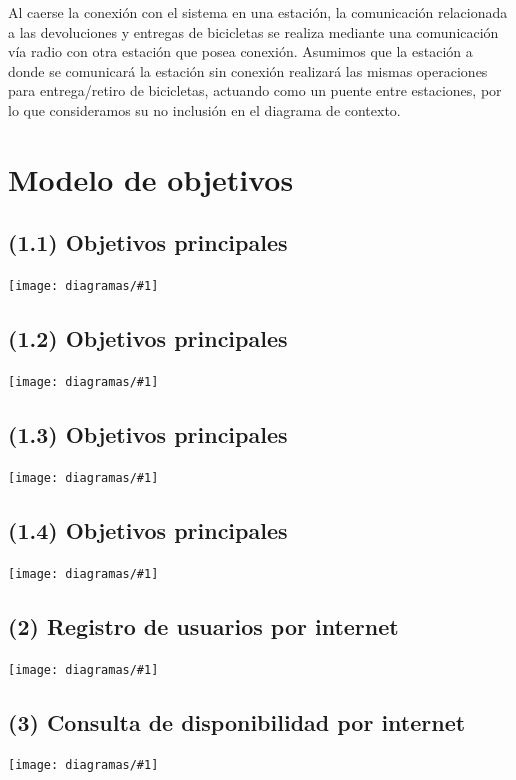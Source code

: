 \documentclass[a4paper, 10pt, twoside]{article}
\newcommand{\diagramav}[1]{
  \texttt{[image: diagramas/\#1]}
}
\newcommand{\diagramah}[1]{
  \texttt{[image: diagramas/\#1]}
}
\begin{document}
Al caerse la conexión con el sistema en una estación, la comunicación relacionada a las devoluciones y entregas de bicicletas se realiza
mediante una comunicación vía radio con otra estación que posea conexión.
Asumimos que la estación a donde se comunicará la estación sin conexión realizará las mismas operaciones para entrega/retiro de bicicletas, actuando como un puente entre estaciones, por lo que consideramos su no inclusión en el diagrama de contexto.




\section{Modelo de objetivos}

\subsection{(1.1)  Objetivos principales}
\diagramav{objetivos-1.1}

\subsection{(1.2)  Objetivos principales}
\diagramah{objetivos-1.2}

\subsection{(1.3)  Objetivos principales}
\diagramav{objetivos-1.3}

\subsection{(1.4)  Objetivos principales}
\diagramah{objetivos-1.4}

\subsection{(2)    Registro de usuarios por internet}
\diagramah{objetivos-2}

\subsection{(3)    Consulta de disponibilidad por internet}
\diagramah{objetivos-3}
\end{document}
